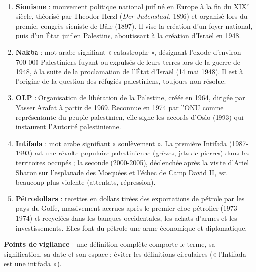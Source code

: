 \documentclass[11pt]{article}
\begin{document}
\begin{corrige}
\begin{enumerate}
    \item \textbf{Sionisme} : mouvement politique national juif né en Europe à la fin du XIX\textsuperscript{e} siècle, théorisé par Theodor Herzl (\emph{Der Judenstaat}, 1896) et organisé lors du premier congrès sioniste de Bâle (1897). Il vise la création d'un foyer national, puis d'un État juif en Palestine, aboutissant à la création d'Israël en 1948.
    \item \textbf{Nakba} : mot arabe signifiant « catastrophe », désignant l'exode d'environ 700 000 Palestiniens fuyant ou expulsés de leurs terres lors de la guerre de 1948, à la suite de la proclamation de l'État d'Israël (14 mai 1948). Il est à l'origine de la question des réfugiés palestiniens, toujours non résolue.
    \item \textbf{OLP} : Organisation de libération de la Palestine, créée en 1964, dirigée par Yasser Arafat à partir de 1969. Reconnue en 1974 par l'ONU comme représentante du peuple palestinien, elle signe les accords d'Oslo (1993) qui instaurent l'Autorité palestinienne.
    \item \textbf{Intifada} : mot arabe signifiant « soulèvement ». La première Intifada (1987-1993) est une révolte populaire palestinienne (grèves, jets de pierres) dans les territoires occupés ; la seconde (2000-2005), déclenchée après la visite d'Ariel Sharon sur l'esplanade des Mosquées et l'échec de Camp David II, est beaucoup plus violente (attentats, répression).
    \item \textbf{Pétrodollars} : recettes en dollars tirées des exportations de pétrole par les pays du Golfe, massivement accrues après le premier choc pétrolier (1973-1974) et recyclées dans les banques occidentales, les achats d'armes et les investissements. Elles font du pétrole une arme économique et diplomatique.
\end{enumerate}
\textbf{Points de vigilance :} une définition complète comporte le terme, sa signification, sa date et son espace ; éviter les définitions circulaires (« l'Intifada est une intifada »).
\end{corrige}
\end{document}
